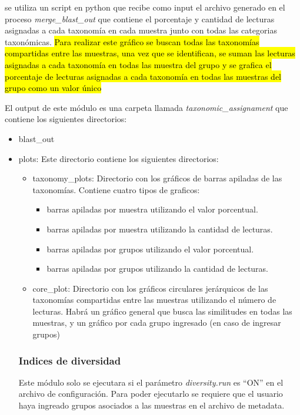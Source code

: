 se utiliza un script en python que recibe como input el archivo generado en el proceso \textit{merge\_blast\_out} que contiene el porcentaje y cantidad de lecturas asignadas a cada taxonomía en cada muestra junto con todas las categorias taxonómicas.
\hl{Para realizar este gráfico se buscan todas las taxonomías compartidas entre las muestras, una vez que se identifican, se suman las lecturas asignadas a cada taxonomía en todas las muestra del grupo y se grafica el porcentaje de lecturas asignadas a cada taxonomía en todas las muestras del grupo como un valor único}


El output de este módulo es una carpeta llamada \textit{taxonomic\_assignament} que contiene los siguientes directorios:
\begin{itemize}
\item blast\_out
\item plots: Este directorio contiene los siguientes directorios:
\begin{itemize}
    \item taxonomy\_plots: Directorio con los gráficos de barras apiladas de las taxonomías. Contiene cuatro tipos de graficos: 
    \begin{itemize}
        \item barras apiladas por muestra utilizando el valor porcentual.
        \item barras apiladas por muestra utilizando la cantidad de lecturas.
        \item barras apiladas por grupos utilizando el valor porcentual.
        \item barras apiladas por grupos utilizando la cantidad de lecturas.
    \end{itemize}
    \item core\_plot: Directorio con los gráficos circulares jerárquicos de las taxonomías compartidas entre las muestras utilizando el número de lecturas. Habrá un gráfico general que busca las similitudes en todas las muestras, y un gráfico por cada grupo ingresado (en caso de ingresar grupos)
\end{itemize}
\subsubsection{Indices de diversidad}
Este módulo solo se ejecutara si el parámetro \textit{diversity.run} es ``ON'' en el archivo de configuración. 
Para poder ejecutarlo se requiere que el usuario haya ingreado grupos asociados a las muestras en el archivo de metadata.


\end{itemize}
